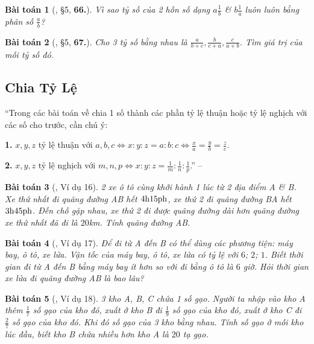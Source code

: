\documentclass{article}
\numberwithin{equation}{section}
\newtheorem{baitoan}{Bài toán}
\begin{document}
\begin{baitoan}[\cite{Binh_Toan_7_tap_1}, \S5, \textbf{66.}]
	Vì sao tỷ số của 2 hỗn số dạng $a\frac{1}{b}$ \& $b\frac{1}{a}$ luôn luôn bằng phân số $\frac{a}{b}$?
\end{baitoan}

\begin{baitoan}[\cite{Binh_Toan_7_tap_1}, \S5, \textbf{67.}]
	Cho 3 tỷ số bằng nhau là $\frac{a}{b + c},\frac{b}{c + a},\frac{c}{a + b}$. Tìm giá trị của mỗi tỷ số đó.
\end{baitoan}

\subsection{Chia Tỷ Lệ}
``Trong các bài toán về chia 1 số thành các phần tỷ lệ thuận hoặc tỷ lệ nghịch với các số cho trước, cần chú ý:
\begin{enumerate*}
	\item[\textbf{1.}] $x,y,z$ tỷ lệ thuận với $a,b,c\Leftrightarrow x:y:z = a:b:c\Leftrightarrow\frac{x}{a} = \frac{y}{b} = \frac{z}{c}$.
	\item[\textbf{2.}] $x,y,z$ tỷ lệ nghịch với $m,n,p\Leftrightarrow x:y:z = \frac{1}{m}:\frac{1}{n}:\frac{1}{p}$.'' -- \cite{Binh_Toan_7_tap_1}
\end{enumerate*}

\begin{baitoan}[\cite{Binh_Toan_7_tap_1}, Ví dụ 16]
	2 xe ô tô cùng khởi hành 1 lúc từ 2 địa điểm A \& B. Xe thứ nhất đi quãng đường AB hết $\rm4h15ph$, xe thứ 2 đi quãng đường BA hết $\rm3h45ph$. Đến chỗ gặp nhau, xe thứ 2 đi được quãng đường dài hơn quãng đường xe thứ nhất đã đi là $20$\emph{km}. Tính quãng đường AB.
\end{baitoan}

\begin{baitoan}[\cite{Binh_Toan_7_tap_1}, Ví dụ 17]
	Để đi từ A đến B có thể dùng các phương tiện: máy bay, ô tô, xe lửa. Vận tốc của máy bay, ô tô, xe lửa có tỷ lệ với $6$; $2$; $1$. Biết thời gian đi từ A đến B bằng máy bay ít hơn so với đi bằng ô tô là $6$ giờ. Hỏi thời gian xe lửa đi quãng đường AB là bao lâu?
\end{baitoan}

\begin{baitoan}[\cite{Binh_Toan_7_tap_1}, Ví dụ 18]
	3 kho A, B, C chứa 1 số gạo. Người ta nhập vào kho A thêm $\frac{1}{7}$ số gạo của kho đó, xuất ở kho B đi $\frac{1}{9}$ số gạo của kho đó, xuất ở kho C đi $\frac{2}{7}$ số gạo của kho đó. Khi đó số gạo của 3 kho bằng nhau. Tính số gạo ở mỗi kho lúc đầu, biết kho B chứa nhiều hơn kho A là $20$ tạ gạo.
\end{baitoan}
\end{document}

